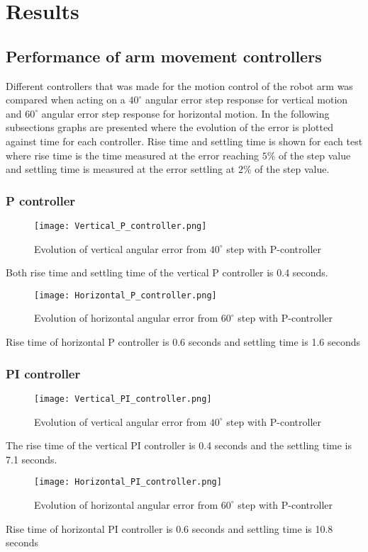 \section{Results}
\subsection{Performance of arm movement controllers}
Different controllers that was made for the motion control of the robot arm was compared when acting on a \(40^{\circ}\) angular error step response for vertical motion and \(60^{\circ}\) angular error step response for horizontal motion. In the following subsections graphs are presented where the evolution of the error is plotted against time for each controller. Rise time and settling time is shown for each test where rise time is the time measured at the error reaching \(5\%\) of the step value and settling time is measured at the error settling at \(2\%\) of the step value.

\subsubsection{P controller}
\begin{figure}[H]
\centering
\texttt{[image: Vertical\_P\_controller.png]}
\caption{Evolution of vertical angular error from \(40^{\circ}\) step with P-controller}
\label{vert_P}
\end{figure}
Both rise time and settling time of the vertical P controller is 0.4 seconds.
\begin{figure}[H]
\centering
\texttt{[image: Horizontal\_P\_controller.png]}
\caption{Evolution of horizontal angular error from \(60^{\circ}\) step with P-controller}
\label{vert_P}
\end{figure}
Rise time of horizontal P controller is 0.6 seconds and settling time is 1.6 seconds

\subsubsection{PI controller}
\begin{figure}[H]
\centering
\texttt{[image: Vertical\_PI\_controller.png]}
\caption{Evolution of vertical angular error from \(40^{\circ}\) step with P-controller}
\label{vert_P}
\end{figure}
The rise time of the vertical PI controller is 0.4 seconds and the settling time is 7.1 seconds.
\begin{figure}[H]
\centering
\texttt{[image: Horizontal\_PI\_controller.png]}
\caption{Evolution of horizontal angular error from \(60^{\circ}\) step with P-controller}
\label{vert_P}
\end{figure}
Rise time of horizontal PI controller is 0.6 seconds and settling time is 10.8 seconds


